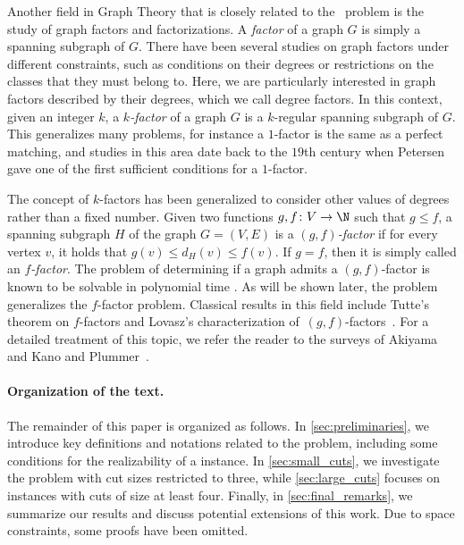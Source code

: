 Another field in Graph Theory that is closely related to the \GRfull{}~problem is the study of graph factors and factorizations.
A \textit{factor} of a graph $G$ is simply a spanning subgraph of $G$.
There have been several studies on graph factors under different constraints, such as conditions on their degrees or restrictions on the classes that they must belong to.
Here, we are particularly interested in graph factors described by their degrees, which we call degree factors.
In this context, given an integer $k$, a \emph{$k$-factor} of a graph $G$ is a $k$-regular spanning subgraph of $G$.
This generalizes many problems, for instance a $1$-factor is the same as a perfect matching, and studies in this area date back to the $19$th century when Petersen \cite{petersen1900} gave one of the first sufficient conditions for a $1$-factor.

The concept of $k$-factors has been generalized to consider other values of degrees rather than a fixed number.
Given two functions $g, f \colon V \to \N$ such that $g \leq f$, a spanning subgraph $H$ of the graph $G = (V, E)$ is a \emph{$(g, f)$-factor} if for every vertex $v$, it holds that $g(v) \leq d_H(v) \leq f(v)$.
If $g = f$, then it is simply called an \emph{$f$-factor}.
The problem of determining if a graph admits a $(g, f)$-factor is known to be solvable in polynomial time \cite{Ans85}.
As will be shown later, the \GRC{} problem generalizes the $f$-factor problem.
Classical results in this field include 
Tutte's theorem on $f$-factors \cite{tutte1952} 
and Lovasz's characterization of~\mbox{$(g,f)$-factors}~\cite{Lovasz70}.
For a detailed treatment of this topic, we refer the reader to the surveys of Akiyama and Kano \cite{akiyama1985} and Plummer~\cite{plummer2007}.

\paragraph{Organization of the text.}
The remainder of this paper is organized as follows. 
%
In \cref{sec:preliminaries}, we introduce key definitions and notations related to the \GRC{} problem, including some conditions for the realizability of a \GRC{} instance. 
%
In \cref{sec:small_cuts}, we investigate the \GRC{} problem with cut sizes restricted to three,
%
while \cref{sec:large_cuts} focuses on instances with cuts of size at least four.
%
Finally, in \cref{sec:final_remarks}, we summarize our results and discuss potential extensions of this work. %
%
Due to space constraints, some proofs have been omitted.
